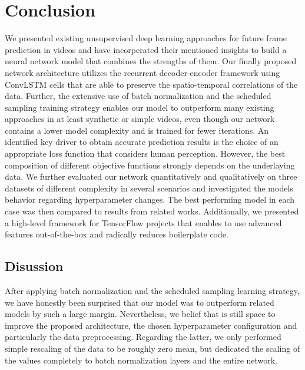 
\chapter{Conclusion} \label{chapter:conclusion}

We presented existing unsupervised deep learning approaches for future frame prediction in videos and have incorperated their mentioned insights to build a neural network model that combines the strengths of them. Our finally proposed network architecture utilizes the recurrent decoder-encoder framework using ConvLSTM cells that are able to preserve the spatio-temporal correlations of the data. Further, the extensive use of batch normalization and the scheduled sampling training strategy enables our model to outperform many existing approaches in at least synthetic or simple videos, even though our network contains a lower model complexity and is trained for fewer iterations. An identified key driver to obtain accurate prediction results is the choice of an appropriate loss function that considers human perception. However, the best composition of different objective functions strongly depends on the underlaying data. We further evaluated our network quantitatively and qualitatively on three datasets of different complexity in several scenarios and investigated the models behavior regarding hyperparameter changes. The best performing model in each case was then compared to results from related works. Additionally, we presented a high-level framework for TensorFlow projects that enables to use advanced features out-of-the-box and radically reduces boilerplate code.

\section{Disussion}

After applying batch normalization and the scheduled sampling learning strategy, we have honestly been surprised that our model was to outperform related models by such a large margin. Nevertheless, we belief that is still space to improve the proposed architecture, the chosen hyperparameter configuration and particularly the data preprocessing. Regarding the latter, we only performed simple rescaling of the data to be roughly zero mean, but dedicated the scaling of the values completely to batch normalization layers and the entire network.

